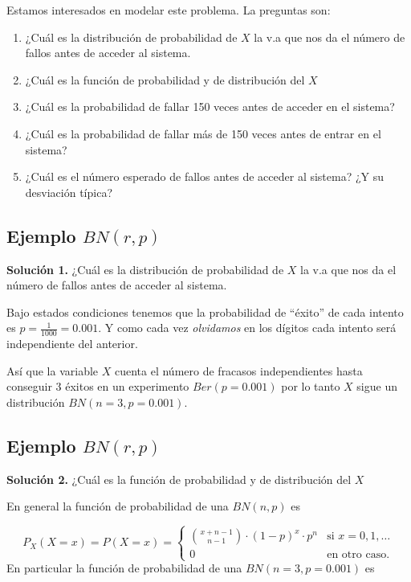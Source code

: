 \documentclass[]{book}
\providecommand{\tightlist}{%
  \setlength{\itemsep}{0pt}\setlength{\parskip}{0pt}}
\begin{document}
Estamos interesados en modelar este problema. La preguntas son:

\begin{enumerate}
\def\labelenumi{\arabic{enumi}.}
\tightlist
\item
  ¿Cuál es la distribución de probabilidad de \(X\) la v.a que nos da el número de fallos antes de acceder al sistema.
\item
  ¿Cuál es la función de probabilidad y de distribución del \(X\)
\item
  ¿Cuál es la probabilidad de fallar 150 veces antes de acceder en el sistema?
\item
  ¿Cuál es la probabilidad de fallar más de 150 veces antes de entrar en el sistema?
\item
  ¿Cuál es el número esperado de fallos antes de acceder al sistema? ¿Y su desviación típica?
\end{enumerate}

\hypertarget{ejemplo-bnrp}{%
\subsection{\texorpdfstring{Ejemplo \(BN(r,p)\)}{Ejemplo BN(r,p)}}\label{ejemplo-bnrp}}

\textbf{Solución 1.} ¿Cuál es la distribución de probabilidad de \(X\) la v.a que nos da el número de fallos antes de acceder al sistema.

Bajo estados condiciones tenemos que la probabilidad de ``éxito'' de cada intento es \(p=\frac{1}{1000}=0.001\). Y como cada vez \emph{olvidamos} en los dígitos cada intento será independiente del anterior.

Así que la variable \(X\) cuenta el número de fracasos independientes hasta conseguir 3 éxitos en un experimento \(Ber(p=0.001)\) por lo tanto \(X\) sigue un distribución \(BN(n=3,p=0.001).\)

\hypertarget{ejemplo-bnrp-1}{%
\subsection{\texorpdfstring{Ejemplo \(BN(r,p)\)}{Ejemplo BN(r,p)}}\label{ejemplo-bnrp-1}}

\textbf{Solución 2.} ¿Cuál es la función de probabilidad y de distribución del \(X\)

En general la función de probabilidad de una \(BN(n,p)\) es

\[
P_X(X=x)=P(X=x)=
\left\{
\begin{array}{cc} 
{x+n-1\choose n-1} \cdot (1-p)^{x}\cdot p^n & \mbox{si }  x=0,1,\ldots \\ 0 & \mbox{en otro caso.}\end{array}\right.
\]
En particular la función de probabilidad de una \(BN(n=3,p=0.001)\) es
\end{document}

